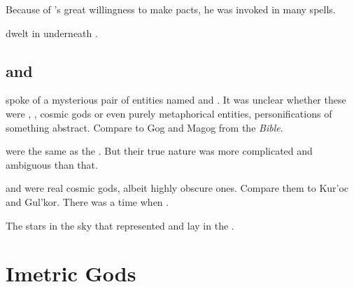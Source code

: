 Because of \Yolbaoth's great willingness to make pacts, he was invoked in many \draconic spells. 

\Yolbaoth dwelt in  underneath \Azmith. 















\section{\Zaz and \Urzaz}
\index{\Zaz}
\index{\Urzaz}
\WanderersInDarknessEmph spoke of a mysterious pair of entities named \Zaz and \Urzaz. 
It was unclear whether these were \dragons, \xss, cosmic gods or even purely metaphorical entities, personifications of something abstract.
Compare to Gog and Magog from the \emph{Bible}.

 were the same as the . 
But their true nature was more complicated and ambiguous than that. 

\Zaz and \Urzaz were real cosmic gods, albeit highly obscure ones. 
Compare them to Kur'oc and Gul'kor.
There was a time when . 

The stars in the sky that represented \Zaz and \Urzaz lay in the .






































\chapter{Imetric Gods}















